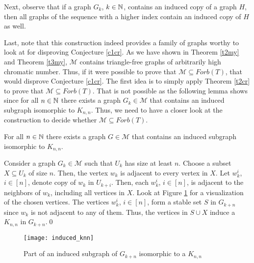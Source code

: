 Next, observe that if a graph $G_k$, $k\in\mathbb{N}$, contains an induced copy of a graph $H$, then all graphs of the sequence with a higher index contain an induced copy of $H$ as well.

Last, note that this construction indeed provides a family of graphs worthy to look at for disproving Conjecture \ref{c1cr}. As we have shown in Theorem \ref{t2my} and Theorem \ref{t3my}, $\mathcal{M}$ contains triangle-free graphs of arbitrarily high chromatic number. Thus, if it were possible to prove that $\mathcal{M}\subseteq\textit{Forb}(T)$, that would disprove Conjecture \ref{c1cr}. The first idea is to simply apply Theorem \ref{t2cr} to prove that $\mathcal{M}\subseteq\textit{Forb}(T)$. That is not possible as the following lemma shows since for all $n\in\mathbb{N}$ there exists a graph $G_k\in\mathcal{M}$ that contains an induced subgraph isomorphic to $K_{n,n}$. Thus, we need to have a closer look at the construction to decide whether $\mathcal{M}\subseteq\textit{Forb}(T)$. 

\begin{lemma}\label{l1my}
For all $n\in\mathbb{N}$ there exists a graph $G\in\mathcal{M}$ that contains an induced subgraph isomorphic to $K_{n,n}$.
\end{lemma}
\begin{prf}
Consider a graph $G_k\in\mathcal{M}$ such that $U_k$ has size at least $n$. Choose a subset $X\subseteq U_k$ of size $n$. Then, the vertex $w_k$ is adjacent to every vertex in $X$. Let $w_k^{i}$, $i\in [n]$, denote copy of $w_k$ in $U_{k+i}$. Then, each $w_k^{i}$, $i\in [n]$, is adjacent to the neighbors of $w_k$, including all vertices in $X$. Look at Figure \ref{f3my} for a visualization of the chosen vertices. The vertices $w_k^{i}$, $i\in [n]$, form a stable set $S$ in $G_{k+n}$ since $w_k$ is not adjacent to any of them. Thus, the vertices in $S\cup X$ induce a $K_{n,n}$ in $G_{k+n}$.\qed
\end{prf}

\begin{figure}[ht]
\begin{center}
\texttt{[image: induced\_knn]}
\end{center}
\caption{Part of an induced subgraph of $G_{k+n}$ isomorphic to a $K_{n,n}$}
\label{f3my}
\end{figure}

